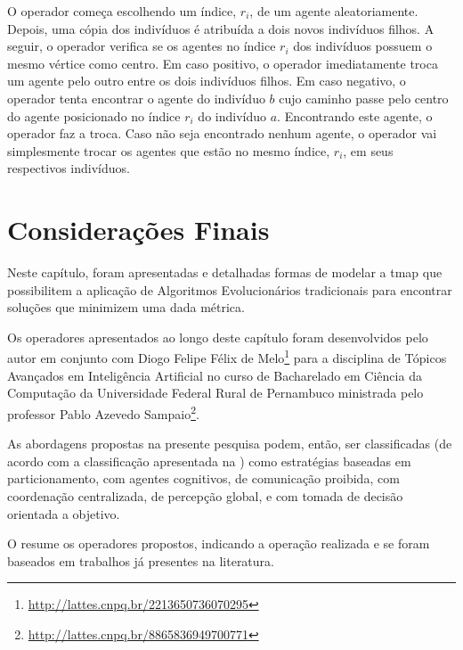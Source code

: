 O operador começa escolhendo um índice, $r_{i}$, de um agente aleatoriamente. 
Depois, uma cópia dos indivíduos é atribuída a dois novos indivíduos filhos. 
A seguir, o operador verifica se os agentes no índice $r_{i}$ dos indivíduos 
possuem o mesmo vértice como centro. Em caso positivo, o operador imediatamente 
troca um agente pelo outro entre os dois indivíduos filhos. Em caso negativo, o 
operador tenta encontrar o agente do indivíduo $b$ cujo caminho passe pelo 
centro do agente posicionado no índice $r_{i}$ do indivíduo $a$. Encontrando 
este agente, o operador faz a troca. Caso não seja encontrado nenhum agente, o 
operador vai simplesmente trocar os agentes que estão no mesmo índice, $r_{i}$, 
em seus respectivos indivíduos.

\section{Considerações Finais}

Neste capítulo, foram apresentadas e detalhadas formas de modelar a \ac{tmap} 
que possibilitem a aplicação de Algoritmos Evolucionários tradicionais para 
encontrar soluções que minimizem uma dada métrica.

Os operadores apresentados ao longo deste capítulo foram desenvolvidos pelo 
autor em conjunto com Diogo Felipe Félix de 
Melo\footnote{\url{http://lattes.cnpq.br/2213650736070295}} para a disciplina 
de Tópicos Avançados em Inteligência Artificial no curso de Bacharelado em 
Ciência da Computação da Universidade Federal Rural de Pernambuco ministrada 
pelo professor Pablo Azevedo 
Sampaio\footnote{\url{http://lattes.cnpq.br/8865836949700771}}.

As abordagens propostas na presente pesquisa podem, então, ser classificadas 
(de acordo com a classificação apresentada na ) como 
estratégias baseadas em particionamento, com agentes cognitivos, de comunicação 
proibida, com coordenação centralizada, de percepção global, e com tomada de 
decisão orientada a objetivo.

O  resume os operadores propostos, indicando a 
operação realizada e se foram baseados em trabalhos já presentes na literatura.

